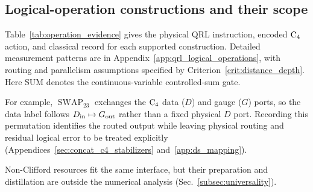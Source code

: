 \documentclass[aps,
prx,
superscriptaddress,
reprint,
longbibliography,
floatfix]{revtex4-2}
\begin{document}
\subsection{Logical-operation constructions and their scope}\label{sec:operations_evidence}
Table~\ref{tab:operation_evidence} gives the physical QRL instruction, encoded ${\rm C_4}$ action, and classical record for each supported construction. Detailed measurement patterns are in Appendix~\ref{app:qrl_logical_operations}, with routing and parallelism assumptions specified by Criterion~\ref{crit:distance_depth}.
Here SUM denotes the continuous-variable controlled-sum gate.

For example, $\operatorname{SWAP}_{23}$ exchanges the ${\rm C_4}$ data ($D$) and gauge ($G$) ports, so the data label follows $D_{\rm in}\mapsto G_{\rm out}$ rather than a fixed physical $D$ port. Recording this permutation identifies the routed output while leaving physical routing and residual logical error to be treated explicitly (Appendices~\ref{sec:concat_c4_stabilizers} and~\ref{app:ds_mapping}).

Non-Clifford resources fit the same interface, but their preparation and distillation are outside the numerical analysis (Sec.~\ref{subsec:universality}).
\end{document}
